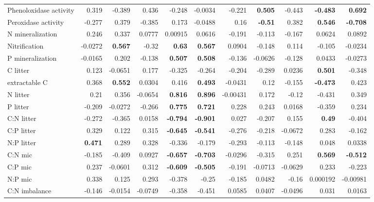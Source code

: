 \documentclass[10pt]{article}
\begin{document}
\begin{flushleft}
\begin{landscape}
\begin{table}[h!]
{\begin{tabular}{lrrrrrrrrrr}
  Phenoloxidase activity & 0.319 & -0.389 & 0.436 & -0.248 & -0.0034 & -0.221 & \textbf{ 0.505 } & -0.443 & \textbf{ -0.483 } & \textbf{ 0.692 } \\ 
  Peroxidase activity & -0.277 & 0.379 & -0.385 & 0.173 & -0.0488 & 0.16 & \textbf{ -0.51 } & 0.382 & \textbf{ 0.546 } & \textbf{ -0.708 } \\ 
  N mineralization & 0.246 & 0.337 & 0.0777 & 0.00915 & 0.0616 & -0.191 & -0.113 & -0.167 & 0.0624 & 0.0892 \\ 
  Nitrification & -0.0272 & \textbf{ 0.567 } & -0.32 & \textbf{ 0.63 } & \textbf{ 0.567 } & 0.0904 & -0.148 & 0.114 & -0.105 & -0.0234 \\ 
  P mineralization & -0.0165 & 0.202 & -0.138 & \textbf{ 0.507 } & \textbf{ 0.508 } & -0.136 & -0.0626 & -0.128 & 0.0433 & -0.0273 \\ 
  C litter & 0.123 & -0.0651 & 0.177 & -0.325 & -0.264 & -0.204 & -0.289 & 0.0236 & \textbf{ 0.501 } & -0.348 \\ 
  extractable C & 0.368 & \textbf{ 0.552 } & 0.0304 & 0.416 & \textbf{ 0.493 } & -0.0431 & 0.12 & -0.155 & \textbf{ -0.473 } & 0.423 \\ 
  N litter & 0.21 & 0.356 & -0.0654 & \textbf{ 0.816 } & \textbf{ 0.896 } & -0.00431 & 0.172 & -0.12 & -0.431 & 0.349 \\ 
  P litter & -0.209 & -0.0272 & -0.266 & \textbf{ 0.775 } & \textbf{ 0.721 } & 0.228 & 0.243 & 0.0168 & -0.359 & 0.234 \\ 
  C:N litter & -0.272 & -0.365 & 0.0158 & \textbf{ -0.794 } & \textbf{ -0.901 } & 0.027 & -0.207 & 0.155 & \textbf{ 0.49 } & -0.404 \\ 
  C:P litter & 0.329 & 0.122 & 0.315 & \textbf{ -0.645 } & \textbf{ -0.541 } & -0.276 & -0.218 & -0.0672 & 0.283 & -0.162 \\ 
  N:P litter & \textbf{ 0.471 } & 0.289 & 0.328 & -0.336 & -0.179 & -0.293 & -0.113 & -0.148 & 0.048 & 0.0338 \\ 
  C:N mic & -0.185 & -0.409 & 0.0927 & \textbf{ -0.657 } & \textbf{ -0.703 } & -0.0296 & -0.315 & 0.251 & \textbf{ 0.569 } & \textbf{ -0.512 } \\ 
  C:P mic & 0.237 & -0.0601 & 0.312 & \textbf{ -0.609 } & \textbf{ -0.505 } & -0.191 & -0.0713 & -0.0629 & 0.233 & -0.223 \\ 
  N:P mic & 0.338 & 0.125 & 0.293 & -0.378 & -0.25 & -0.185 & 0.0482 & -0.16 & 0.000192 & -0.00981 \\ 
  C:N imbalance & -0.146 & -0.0154 & -0.0749 & -0.358 & -0.451 & 0.0585 & 0.0407 & -0.0496 & 0.031 & 0.0163 \\ 

\end{tabular}}
\end{table}
\end{landscape}
\end{flushleft}
\end{document}
